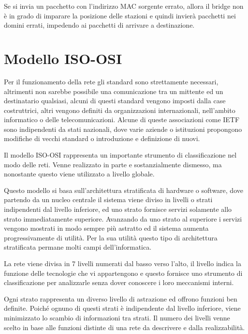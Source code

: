 \documentclass{article}
\numberwithin{equation}{subsection}
\begin{document}
Se si invia un pacchetto con l'indirizzo MAC sorgente errato, allora il bridge non è in grado di imparare la posizione delle stazioni e quindi invierà pacchetti 
nei domini errati, impedendo ai pacchetti di arrivare a destinazione. 

\clearpage

\section{Modello ISO-OSI}

Per il funzionamento della rete gli standard sono strettamente necessari, altrimenti non sarebbe possibile una comunicazione tra un mittente ed un destinatario qualsiasi, 
alcuni di questi standard vengono imposti dalla case costruttrici, altri vengono definiti da organizzazioni internazionali, nell'ambito informatico o delle 
telecomunicazioni. Alcune di queste associazioni come IETF sono indipendenti da stati nazionali, dove varie aziende o istituzioni propongono modifiche di vecchi 
standard o introduzione e definizione di nuovi. 

Il modello ISO-OSI rappresenta un importante strumento di classificazione nel modo delle reti. Venne realizzato in parte e sostanzialmente dismesso, ma nonostante 
questo viene utilizzato a livello globale. 

Questo modello si basa sull'architettura stratificata di hardware o software, dove partendo da un nucleo centrale il sistema viene diviso in livelli o strati 
indipendenti dal livello inferiore, ed uno strato fornisce servizi solamente allo strato immediatamente superiore. Avanzando da uno strato al superiore i servizi vengono mostrati in modo 
sempre più astratto ed il sistema aumenta progressivamente di utilità. Per la sua utilità questo tipo di architettura stratificata permane molti campi dell'informatica. 

La rete viene divisa in 7 livelli numerati dal basso verso l'alto, il livello indica la funzione delle tecnologie che vi appartengono e questo fornisce uno strumento di 
classificazione per analizzarle senza dover conoscere i loro meccanismi interni. 


Ogni strato rappresenta un diverso livello di astrazione ed offrono funzioni ben definite. Poiché ognuno di questi strati è indipendente dal livello inferiore, viene minimizzato lo scambio 
di informazioni tra strati. Il numero dei livelli venne scelto in base alle funzioni distinte di una rete da descrivere e dalla realizzabilità. 
\end{document}
